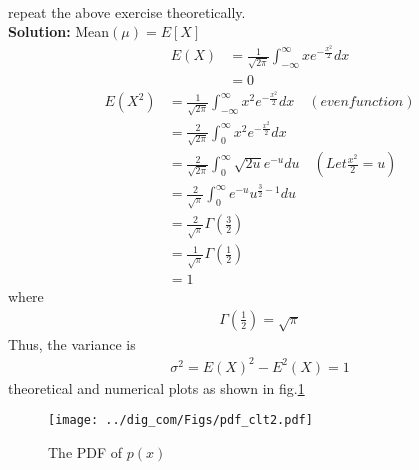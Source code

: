 \documentclass{article}
\numberwithin{equation}{subsection}
\numberwithin{figure}{subsection}
\providecommand{\brak}[1]{\ensuremath{\left(#1\right)}}
\providecommand{\sbrak}[1]{\ensuremath{{}\left[#1\right]}}
\newcommand{\solution}{\noindent \textbf{Solution: }}
\renewcommand\thesection{\arabic{section}}
\renewcommand\thesubsection{\thesection.\arabic{subsection}}
\begin{document}
\begin{enumerate}[label=\thesubsection.\arabic*,ref=\thesubsection.\arabic{figure}]
\begin{align}
\end{align}
repeat the above exercise theoretically.\\
\solution
Mean$(\mu) = E\sbrak{X}$
\begin{align}
    E(X) &= \frac{1}{\sqrt{2\pi}} \int_{-\infty}^{\infty} x e^{-\frac{x^2}{2}}dx\\
    &=0 
\end{align}
\begin{align}
    E\brak{X^2}&= \frac{1}{\sqrt{2\pi}}\int_{-\infty}^{\infty} x^2
e^ {-\frac{x^2}{2}} dx \quad \brak{even function}\\
    &= \frac{2}{\sqrt{2\pi}} \int_{0}^{\infty} x^2 e^{-\frac{x^2}{2}} dx\\
    &= \frac{2}{\sqrt{2\pi}}\int_{0}^{\infty}\sqrt{2u}e^{-u} du \quad\brak{Let \frac{x^2}{2}= u}\\
    &= \frac{2}{\sqrt{\pi}} \int_{0}^{\infty} e^{-u} u^{\frac{3}{2}-1} du\\
    &= \frac{2}{\sqrt{\pi}} \Gamma\brak{{\frac{3}{2}}}\\
    &= \frac{1}{\sqrt{\pi}}\Gamma\brak{\frac{1}{2}} \\
    &= 1
\end{align}
where 
\begin{align}
\Gamma\brak{\frac{1}{2}}=\sqrt{\pi}
\end{align}
%
Thus, the  variance is
\begin{align}
    \sigma^2 =  E\brak X^2 - E^2\brak X = 1
\end{align}
theoretical and numerical plots as shown in fig.\ref{fig:PDF_px}
\begin{center}
\end{center}
\begin{figure}
\centering
\texttt{[image: ../dig\_com/Figs/pdf\_clt2.pdf]}  
\caption{The PDF of $p\brak{x}$}
\label{fig:PDF_px}
\end{figure}
\end{enumerate}
\end{document}
